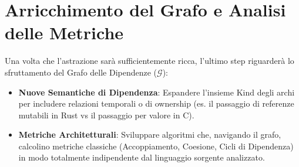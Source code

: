 \section{Arricchimento del Grafo e Analisi delle Metriche}
Una volta che l'astrazione sarà sufficientemente ricca, l'ultimo step riguarderà lo sfruttamento del Grafo delle Dipendenze ($\mathcal{G}$):
\begin{itemize}
    \item \textbf{Nuove Semantiche di Dipendenza}: Espandere l'insieme $\text{Kind}$ degli archi per includere relazioni temporali o di ownership (es. il passaggio di referenze mutabili in Rust vs il passaggio per valore in C).
    \item \textbf{Metriche Architetturali}: Sviluppare algoritmi che, navigando il grafo, calcolino metriche classiche (Accoppiamento, Coesione, Cicli di Dipendenza) in modo totalmente indipendente dal linguaggio sorgente analizzato.
\end{itemize}
